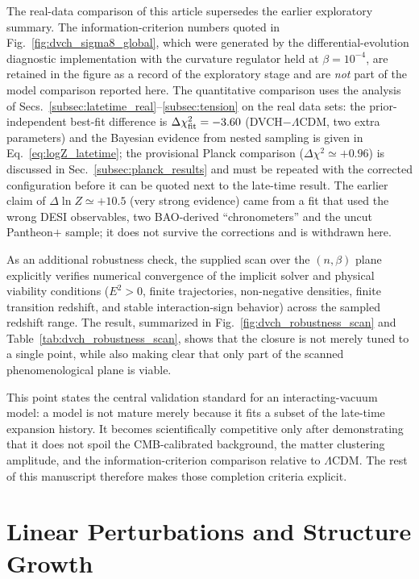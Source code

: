 \documentclass[pdflatex,sn-mathphys-num]{sn-jnl}%
\begin{document}
The real-data comparison of this article supersedes the earlier exploratory
summary. The information-criterion numbers quoted in
Fig.~\ref{fig:dvch_sigma8_global}, which were generated by the
differential-evolution diagnostic implementation with the curvature regulator held at
$\beta=10^{-4}$, are retained in the figure as a record of the exploratory
stage and are \emph{not} part of the model comparison reported here. The
quantitative comparison uses the analysis of
Secs.~\ref{subsec:latetime_real}--\ref{subsec:tension} on the real data
sets: the prior-independent best-fit difference is
$\Delta\chi^2_{\rm fit}=-3.60$ (DVCH$-$$\Lambda$CDM, two extra parameters)
and the Bayesian evidence from nested sampling is given in
Eq.~\eqref{eq:logZ_latetime}; the provisional Planck comparison
($\Delta\chi^2\simeq+0.96$) is discussed in
Sec.~\ref{subsec:planck_results} and must be repeated with the corrected
configuration before it can be quoted next to the late-time result.
The earlier claim of $\Delta\ln Z\simeq+10.5$ (very strong evidence)
came from a fit that used the wrong DESI observables, two BAO-derived
``chronometers'' and the uncut Pantheon$+$ sample; it does not survive the
corrections and is withdrawn here.

As an additional robustness check, the supplied scan over the $(n,\beta)$
plane explicitly verifies numerical convergence of the implicit solver and
physical viability conditions ($E^2>0$, finite trajectories, non-negative
densities, finite transition redshift, and stable interaction-sign behavior)
across the sampled redshift range. The result, summarized in
Fig.~\ref{fig:dvch_robustness_scan} and Table~\ref{tab:dvch_robustness_scan},
shows that the closure is not merely tuned to a single point, while also making
clear that only part of the scanned phenomenological plane is viable.

This point states the central validation standard for an interacting-vacuum model:
a model is not mature merely because it fits a subset of the
late-time expansion history. It becomes scientifically competitive only after
demonstrating that it does not spoil the CMB-calibrated background, the matter
clustering amplitude, and the information-criterion comparison relative to
$\Lambda$CDM. The rest of this manuscript therefore makes those completion
criteria explicit.

\section{Linear Perturbations and Structure Growth}
\label{sec:perturbations}
\end{document}
